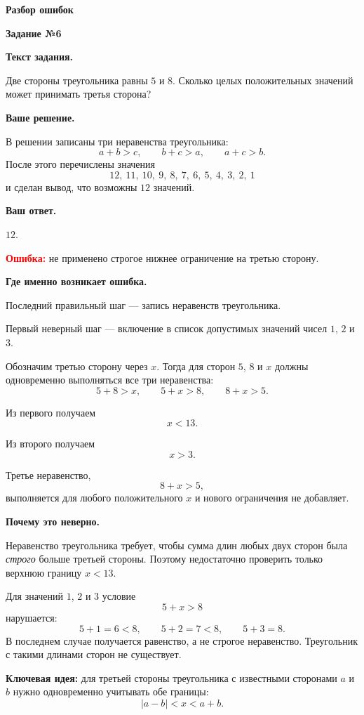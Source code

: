 \documentclass[12pt,a4paper]{article}
\newcommand{\tasktitle}[1]{%
  \phantomsection\label{task:#1}%
  {\LARGE\bfseries Задание №#1}\par
  \vspace{0.6em}
}
\begin{document}
\newpage
\vspace*{\fill}
\begin{center}
{\Huge\bfseries Разбор ошибок}
\end{center}
\vspace*{\fill}

\newpage
\tasktitle{6}

\textbf{Текст задания.}

Две стороны треугольника равны $5$ и $8$. Сколько целых положительных значений может принимать третья сторона?

\textbf{Ваше решение.}

В решении записаны три неравенства треугольника:
\[
a+b>c,\qquad b+c>a,\qquad a+c>b.
\]
После этого перечислены значения
\[
12,\ 11,\ 10,\ 9,\ 8,\ 7,\ 6,\ 5,\ 4,\ 3,\ 2,\ 1
\]
и сделан вывод, что возможны $12$ значений.

\textbf{Ваш ответ.}

$12$.

\textcolor{red}{\textbf{Ошибка:}} не применено строгое нижнее ограничение на третью сторону.

\textbf{Где именно возникает ошибка.}

Последний правильный шаг --- запись неравенств треугольника.

Первый неверный шаг --- включение в список допустимых значений чисел $1$, $2$ и $3$.

Обозначим третью сторону через $x$. Тогда для сторон $5$, $8$ и $x$ должны одновременно выполняться все три неравенства:
\[
5+8>x,\qquad 5+x>8,\qquad 8+x>5.
\]

Из первого получаем
\[
x<13.
\]

Из второго получаем
\[
x>3.
\]

Третье неравенство,
\[
8+x>5,
\]
выполняется для любого положительного $x$ и нового ограничения не добавляет.

\textbf{Почему это неверно.}

Неравенство треугольника требует, чтобы сумма длин любых двух сторон была \emph{строго} больше третьей стороны. Поэтому недостаточно проверить только верхнюю границу $x<13$.

Для значений $1$, $2$ и $3$ условие
\[
5+x>8
\]
нарушается:
\[
5+1=6<8,\qquad
5+2=7<8,\qquad
5+3=8.
\]
В последнем случае получается равенство, а не строгое неравенство. Треугольник с такими длинами сторон не существует.

\textcolor{blue!60!black}{\textbf{Ключевая идея:}} для третьей стороны треугольника с известными сторонами $a$ и $b$ нужно одновременно учитывать обе границы:
\[
|a-b|<x<a+b.
\]
\end{document}
